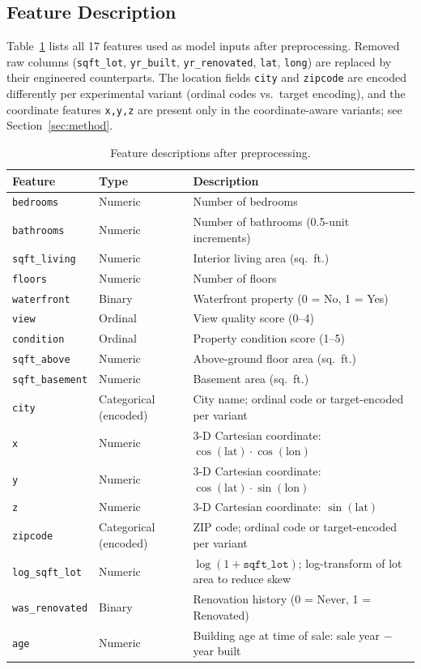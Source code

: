 \subsection{Feature Description}

Table~\ref{tab:features} lists all 17 features used as model inputs after
preprocessing. Removed raw columns (\texttt{sqft\_lot}, \texttt{yr\_built},
\texttt{yr\_renovated}, \texttt{lat}, \texttt{long}) are replaced by their
engineered counterparts. The location fields \texttt{city} and \texttt{zipcode}
are encoded differently per experimental variant (ordinal codes vs.\ target
encoding), and the coordinate features \texttt{x,y,z} are present only in the
coordinate-aware variants; see Section~\ref{sec:method}.

\begin{table}[h]
\centering
\caption{Feature descriptions after preprocessing.}
\label{tab:features}
\begin{tabular}{llp{7.5cm}}
\toprule
\textbf{Feature} & \textbf{Type} & \textbf{Description} \\
\midrule
\texttt{bedrooms}        & Numeric   & Number of bedrooms \\
\texttt{bathrooms}       & Numeric   & Number of bathrooms (0.5-unit increments) \\
\texttt{sqft\_living}    & Numeric   & Interior living area (sq.\ ft.) \\
\texttt{floors}          & Numeric   & Number of floors \\
\texttt{waterfront}      & Binary    & Waterfront property (0 = No, 1 = Yes) \\
\texttt{view}            & Ordinal   & View quality score (0--4) \\
\texttt{condition}       & Ordinal   & Property condition score (1--5) \\
\texttt{sqft\_above}     & Numeric   & Above-ground floor area (sq.\ ft.) \\
\texttt{sqft\_basement}  & Numeric   & Basement area (sq.\ ft.) \\
\texttt{city}            & Categorical (encoded) & City name; ordinal code or target-encoded per variant \\
\texttt{x}               & Numeric   & 3-D Cartesian coordinate: $\cos(\text{lat})\cdot\cos(\text{lon})$ \\
\texttt{y}               & Numeric   & 3-D Cartesian coordinate: $\cos(\text{lat})\cdot\sin(\text{lon})$ \\
\texttt{z}               & Numeric   & 3-D Cartesian coordinate: $\sin(\text{lat})$ \\
\texttt{zipcode}         & Categorical (encoded) & ZIP code; ordinal code or target-encoded per variant \\
\texttt{log\_sqft\_lot}  & Numeric   & $\log(1+\texttt{sqft\_lot})$; log-transform of lot area to reduce skew \\
\texttt{was\_renovated}  & Binary    & Renovation history (0 = Never, 1 = Renovated) \\
\texttt{age}             & Numeric   & Building age at time of sale: sale year $-$ year built \\
\bottomrule
\end{tabular}
\end{table}
